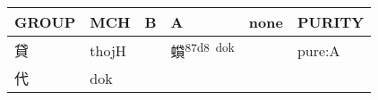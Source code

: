 \documentclass[14pt,a4paper]{scrartcl}
\begin{document}
\begin{longtable}[c]{@{}llllll@{}}
\toprule
\begin{minipage}[b]{0.14\columnwidth}\raggedright\strut
GROUP
\strut\end{minipage} &
\begin{minipage}[b]{0.14\columnwidth}\raggedright\strut
MCH
\strut\end{minipage} &
\begin{minipage}[b]{0.14\columnwidth}\raggedright\strut
B
\strut\end{minipage} &
\begin{minipage}[b]{0.14\columnwidth}\raggedright\strut
A
\strut\end{minipage} &
\begin{minipage}[b]{0.14\columnwidth}\raggedright\strut
none
\strut\end{minipage} &
\begin{minipage}[b]{0.14\columnwidth}\raggedright\strut
PURITY
\strut\end{minipage}\tabularnewline
\midrule
\endhead
\begin{minipage}[t]{0.14\columnwidth}\raggedright\strut
貸
\strut\end{minipage} &
\begin{minipage}[t]{0.14\columnwidth}\raggedright\strut
thojH
\strut\end{minipage} &
\begin{minipage}[t]{0.14\columnwidth}\raggedright\strut
\strut\end{minipage} &
\begin{minipage}[t]{0.14\columnwidth}\raggedright\strut
蟘\textsuperscript{87d8~dok}
\strut\end{minipage} &
\begin{minipage}[t]{0.14\columnwidth}\raggedright\strut
\strut\end{minipage} &
\begin{minipage}[t]{0.14\columnwidth}\raggedright\strut
pure:A
\strut\end{minipage}\tabularnewline
\begin{minipage}[t]{0.14\columnwidth}\raggedright\strut
代
\strut\end{minipage} &
\begin{minipage}[t]{0.14\columnwidth}\raggedright\strut
dok
\strut\end{minipage} &
\begin{minipage}[t]{0.14\columnwidth}\raggedright\strut
\strut\end{minipage} &
\begin{minipage}[t]{0.14\columnwidth}\raggedright\strut

\end{minipage}
\end{longtable}
\end{document}
